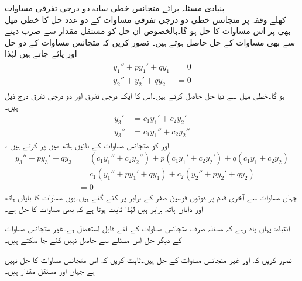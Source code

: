 \quad بنیادی مسئلہ برائے متجانس خطی سادہ دو درجی تفرقی مساوات\\
کھلے وقفہ  پر متجانس خطی دو درجی تفرقی مساوات کے دو عدد حل کا خطی میل بھی  پر اس مساوات کا حل ہو گا۔بالخصوص ان حل کو مستقل مقدار سے ضرب دینے سے بھی مساوات کے حل حاصل ہوتے ہیں۔
 تصور کریں کہ متجانس مساوات  کے دو حل  اور  پائے جاتے ہیں لہٰذا
\begin{gather}
\begin{aligned}\label{مساوات_درجہ_دو_خطی_میل}
y_1''+py_1'+qy_1&=0\\
y_2''+y_2'+qy_2&=0
\end{aligned}
\end{gather}
ہو گا۔خطی میل سے نیا حل  حاصل کرتے ہیں۔اس کا ایک درجی تفرق اور دو درجی تفرق درج ذیل ہیں۔
\begin{align*}
y_3' &=c_1y_1'+c_2y_2'\\
y_3'' &=c_1 y_1''+c_2y_2''
\end{align*}
،  اور  کو متجانس مساوات کے بائیں ہاتھ میں پر کرتے ہیں
\begin{align*}
y_3''+py_3'+qy_3&=(c_1 y_1''+c_2y_2'')+p(c_1y_1'+c_2y_2')+q(c_1 y_1+c_2 y_2)\\
&=c_1(y_1''+py_1'+qy_1)+c_2(y_2''+py_2'+qy_2)\\
&=0
\end{align*}
جہاں مساوات  سے آخری قدم پر دونوں قوسین صفر کے برابر پر کئے گئے ہیں۔یوں مساوات کا بایاں ہاتھ اور دایاں ہاتھ برابر ہیں لہٰذا ثابت ہوتا ہے کہ  بھی مساوات    کا حل ہے۔

انتباہ: یہاں یاد رہے کہ مسئلہ  صرف متجانس مساوات کے لئے قابل استعمال ہے۔غیر متجانس مساوات کے دیگر حل اس مسئلے سے حاصل نہیں کئے جا سکتے ہیں۔

تصور کریں کہ  اور  غیر متجانس مساوات  کے حل ہیں۔ثابت کریں کہ  اس متجانس مساوات کا حل نہیں ہے جہاں  اور  مستقل مقدار ہیں۔


